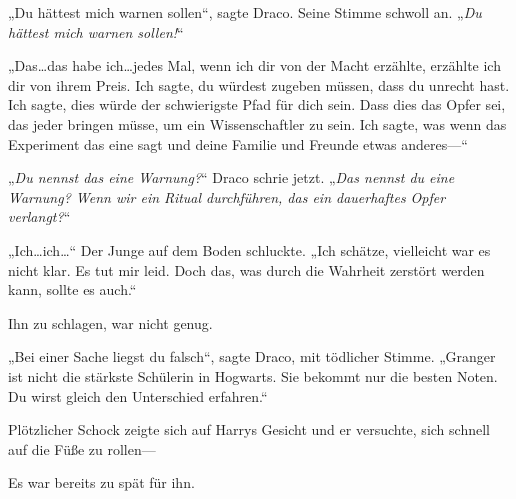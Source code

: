 „Du hättest mich warnen sollen“, sagte Draco. Seine Stimme schwoll an. „\emph{Du hättest mich warnen sollen!}“

„Das…das habe ich…jedes Mal, wenn ich dir von der Macht erzählte, erzählte ich dir von ihrem Preis. Ich sagte, du würdest zugeben müssen, dass du unrecht hast. Ich sagte, dies würde der schwierigste Pfad für dich sein. Dass dies das Opfer sei, das jeder bringen müsse, um ein Wissenschaftler zu sein. Ich sagte, was wenn das Experiment das eine sagt und deine Familie und Freunde etwas anderes—“

„\emph{Du nennst das eine Warnung?}“ Draco schrie jetzt. „\emph{Das nennst du eine Warnung? Wenn wir ein Ritual durchführen, das ein dauerhaftes Opfer verlangt?}“

„Ich…ich…“ Der Junge auf dem Boden schluckte.
„Ich schätze, vielleicht war es nicht klar. Es tut mir leid. Doch das, was durch die Wahrheit zerstört werden kann, sollte es auch.“

Ihn zu schlagen, war nicht genug.

„Bei einer Sache liegst du falsch“, sagte Draco, mit tödlicher Stimme.
„Granger ist nicht die stärkste Schülerin in Hogwarts. Sie bekommt nur die besten Noten. Du wirst gleich den Unterschied erfahren.“

Plötzlicher Schock zeigte sich auf Harrys Gesicht und er versuchte, sich schnell auf die Füße zu rollen—

Es war bereits zu spät für ihn.

